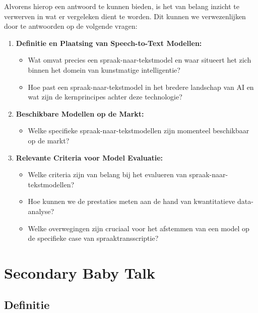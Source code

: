 Alvorens hierop een antwoord te kunnen bieden, is het van belang inzicht te verwerven in wat er vergeleken dient te worden. Dit kunnen we verwezenlijken door te antwoorden op de volgende vragen:
\begin{enumerate}[label=\arabic*.]
    \item \textbf{Definitie en Plaatsing van Speech-to-Text Modellen:}
    \begin{itemize}
        \item Wat omvat precies een spraak-naar-tekstmodel en waar situeert het zich binnen het domein van kunstmatige intelligentie?
        \item Hoe past een spraak-naar-tekstmodel in het bredere landschap van AI en wat zijn de kernprincipes achter deze technologie?
    \end{itemize}
    
    \item \textbf{Beschikbare Modellen op de Markt:}
    \begin{itemize}
        \item Welke specifieke spraak-naar-tekstmodellen zijn momenteel beschikbaar op de markt?
    \end{itemize}
    
    \item \textbf{Relevante Criteria voor Model Evaluatie:}
    \begin{itemize}
        \item Welke criteria zijn van belang bij het evalueren van spraak-naar-tekstmodellen?
        \item Hoe kunnen we de prestaties meten aan de hand van kwantitatieve data-analyse?
        \item Welke overwegingen zijn cruciaal voor het afstemmen van een model op de specifieke case van spraaktransscriptie?
    \end{itemize}
\end{enumerate}
\section{Secondary Baby Talk}
\subsection{Definitie}

